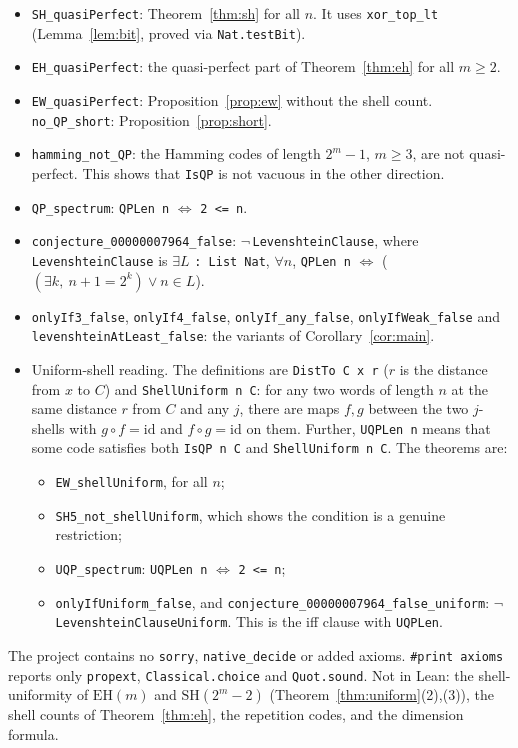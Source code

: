 \documentclass[11pt]{article}
\theoremstyle{definition}
\theoremstyle{remark}
\begin{document}
\begin{itemize}
\item \texttt{SH\_quasiPerfect}: Theorem~\ref{thm:sh} for all $n$. It uses
\texttt{xor\_top\_lt} (Lemma~\ref{lem:bit}, proved via \texttt{Nat.testBit}).
\item \texttt{EH\_quasiPerfect}: the quasi-perfect part of
Theorem~\ref{thm:eh} for all $m\ge2$.
\item \texttt{EW\_quasiPerfect}: Proposition~\ref{prop:ew} without the shell
count. \texttt{no\_QP\_short}: Proposition~\ref{prop:short}.
\item \texttt{hamming\_not\_QP}: the Hamming codes of length $2^m-1$, $m\ge3$,
are not quasi-perfect. This shows that \texttt{IsQP} is not vacuous in the
other direction.
\item \texttt{QP\_spectrum}: \texttt{QPLen n} $\iff$ \texttt{2 <= n}.
\item \texttt{conjecture\_00000007964\_false}: $\neg$\,\texttt{LevenshteinClause}, where
\texttt{LevenshteinClause} is
$\exists L$ \texttt{: List Nat}, $\forall n$, \texttt{QPLen n} $\iff$ ($(\exists k,\ n+1=2^k)\lor n\in L$).
\item \texttt{onlyIf3\_false}, \texttt{onlyIf4\_false},
\texttt{onlyIf\_any\_false}, \texttt{onlyIfWeak\_false} and
\texttt{levenshteinAtLeast\_false}: the variants of Corollary~\ref{cor:main}.
\item Uniform-shell reading. The definitions are \texttt{DistTo C x r}
($r$ is the distance from $x$ to $C$) and \texttt{ShellUniform n C}: for any
two words of length $n$ at the same distance $r$ from $C$ and any $j$, there
are maps $f,g$ between the two $j$-shells with $g\circ f=\mathrm{id}$ and
$f\circ g=\mathrm{id}$ on them. Further, \texttt{UQPLen n} means that some
code satisfies both \texttt{IsQP n C} and \texttt{ShellUniform n C}. The
theorems are:
\begin{itemize}
\item \texttt{EW\_shellUniform}, for all $n$;
\item \texttt{SH5\_not\_shellUniform}, which shows the condition is a genuine
restriction;
\item \texttt{UQP\_spectrum}: \texttt{UQPLen n} $\iff$ \texttt{2 <= n};
\item \texttt{onlyIfUniform\_false}, and
\texttt{conjecture\_00000007964\_false\_uniform}:
$\neg$\,\texttt{LevenshteinClauseUniform}. This is the iff clause with
\texttt{UQPLen}.
\end{itemize}
\end{itemize}
The project contains no \texttt{sorry}, \texttt{native\_decide} or added
axioms. \texttt{\#print axioms} reports only \texttt{propext},
\texttt{Classical.choice} and \texttt{Quot.sound}. Not in Lean: the
shell-uniformity of $\mathrm{EH}(m)$ and $\mathrm{SH}(2^m-2)$
(Theorem~\ref{thm:uniform}(2),(3)), the shell counts of Theorem~\ref{thm:eh},
the repetition codes, and the dimension formula.
\end{document}
